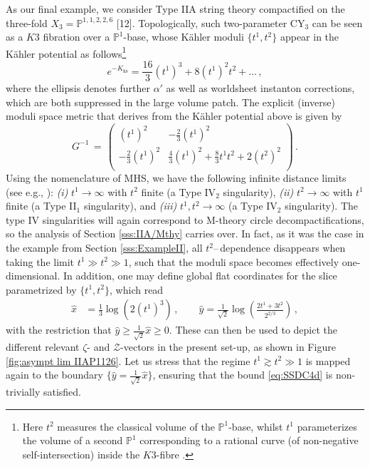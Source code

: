 As our final example, we consider Type IIA string theory compactified on the three-fold $X_3=\mathbb{P}^{1,1,2,2,6}$ [12]. Topologically, such two-parameter CY$_3$ can be seen as a $K3$ fibration over a $\mathbb{P}^1$-base, whose K\"ahler moduli $\lbrace t^1, t^2 \rbrace$ appear in the K\"ahler potential as follows\footnote{Here $t^2$ measures the classical volume of the $\mathbb{P}^1$-base, whilst $t^1$ parameterizes the volume of a second $\mathbb{P}^1$ corresponding to a rational curve (of non-negative self-intersection) inside the $K3$-fibre \cite{Candelas:1993dm}.}
%
\begin{equation}\label{eq:kahlerpotP11226}
	e^{-K_{\text{ks}}} = \frac{16}{3}(t^1)^3 + 8(t^1)^2 t^2 + \ldots\, ,
\end{equation}
%
where the ellipsis denotes further $\alpha'$ as well as worldsheet instanton corrections, which are both suppressed in the large volume patch. The explicit (inverse) moduli space metric that derives from the K\"ahler potential above is given by 
%
\begin{equation}\label{eq:fullinversemetricP11226}
	G^{-1}\, = \, \left(
	\begin{array}{cc}
		(t^1)^2 & - \frac{2}{3} (t^1)^2  \\
		- \frac{2}{3} (t^1)^2 & \frac{4}{3}(t^1)^2+\frac{8}{3} t^1 t^2 +2 (t^2)^2 \\
	\end{array}
	\right) \, .
\end{equation}
% 
Using the nomenclature of MHS, we have the following infinite distance limits (see e.g., \cite{kerr2019polarized, Bastian:2021eom}): \emph{(i)} $t^1 \to \infty$ with $t^2$ finite (a Type IV$_2$ singularity), \emph{(ii)} $t^2 \to \infty$ with $t^1$ finite (a Type II$_1$ singularity), and \emph{(iii)} $t^1,t^2 \to \infty$ (a Type IV$_2$ singularity). The type IV singularities will again correspond to M-theory circle decompactifications, so the analysis of Section \ref{sss:IIA/Mthy} carries over. In fact, as it was the case in the example from Section \ref{sss:ExampleII}, all $t^2$--\,dependence disappears when taking the limit $t^1\gg t^2 \gg 1$, such that the moduli space becomes effectively one-dimensional. In addition, one may define global flat coordinates for the slice parametrized by $\lbrace t^1, t^2\rbrace$, which read
%
\begin{equation}\label{e:mod 11226}
 \begin{aligned}
     \hat{x} &= \frac{1}{3}\log \left(2 (t^1)^3\right)\, , \qquad \hat{y} =\frac{1}{\sqrt{2}}\log \left( \frac{2t^1+3t^2}{2^{2/3}}\right)\, ,
 \end{aligned}
\end{equation}
%
with the restriction that $\hat{y} \geq \frac{1}{\sqrt{2}}\hat{x}\geq 0$. These can then be used to depict the different relevant $\zeta$- and $\mathcal{Z}$-vectors in the present set-up, as shown in Figure \ref{fig:asympt lim  IIAP1126}. Let us stress that the regime $t^1\gtrsim t^2 \gg 1$ is mapped again to the boundary $\{\hat{y}=\frac{1}{\sqrt{2}}\hat{x}\}$, ensuring that the bound \eqref{eq:SSDC4d} is non-trivially satisfied. %
	
